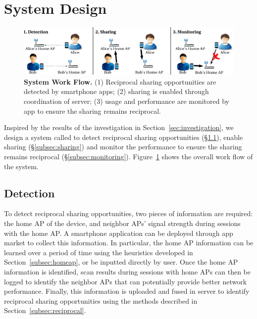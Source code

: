 \section{System Design}
\label{sec:design}

\begin{figure}[t]
  \centering
  \includegraphics[width=\textwidth]{./figures/design.pdf}
  \caption{\textbf{\wisefi{} System Work Flow.} (1) Reciprocal sharing
    opportunities are detected by \wisefi{} smartphone apps; (2) \wifi{} sharing
    is enabled through coordination of \wisefi{} server; (3) \wifi{} usage and
    performance are monitored by \wisefi{} app to ensure the sharing remains
  reciprocal.}
  \label{fig:design}
\end{figure}

Inspired by the results of the investigation in Section~\ref{sec:investigation},
we design a system called \wisefi{} to detect reciprocal sharing
opportunities (\S\ref{subsec:detection}), enable \wifi{} sharing
(\S\ref{subsec:sharing}) and monitor the \wifi{} performance to ensure the
sharing remains reciprocal (\S\ref{subsec:monitoring}). Figure~\ref{fig:design}
shows the overall work flow of the \wisefi{} system.

\subsection{Detection}
\label{subsec:detection}

To detect reciprocal sharing opportunities, two pieces of information are
required: the home AP of the device, and neighbor APs' signal strength during
\wifi{} sessions with the home AP. A smartphone application can be deployed
through app market to collect this information. In particular, the home AP
information can be learned over a period of time using the heuristics developed
in Section~\ref{subsec:homeap}, or be inputted directly by user. Once the home
AP information is identified, \wifi{} scan results during sessions with home APs
can then be logged to identify the neighbor APs that can potentially provide
better network performance. Finally, this information is uploaded and fused in
\wisefi{} server to identify reciprocal sharing opportunities using the methods
described in Section~\ref{subsec:reciprocal}.

